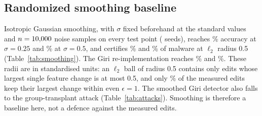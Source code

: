 \subsection{Randomized smoothing baseline}\label{sec:smooth}
Isotropic Gaussian smoothing, with $\sigma$ fixed beforehand at the standard values and $n=10{,}000$ noise samples on every test point (\ResNSeedsSmooth{} seeds), reaches \ResRsQuarterAcc\% accuracy at $\sigma=0.25$ and \ResRsHalfAcc\% at $\sigma=0.5$, and certifies \ResRsQuarterCertHalf\% and \ResRsHalfCertHalf\% of malware at $\ell_2$ radius 0.5 (Table~\ref{tab:smoothing}). The Giri re-implementation reaches \ResRsGiriAcc\% and \ResRsGiriCertHalf\%. These radii are in standardised units: an $\ell_2$ ball of radius 0.5 contains only edits whose largest single feature change is at most 0.5, and only \PsEpsLeOnePct\% of the measured edits keep their largest change within even $\epsilon=1$. The smoothed Giri detector also falls to the group-transplant attack (Table~\ref{tab:attacks}). Smoothing is therefore a baseline here, not a defence against the measured edits. %

\begin{table}[!htbp]
\centering\small
\caption{Randomized smoothing on every test point: clean accuracy, abstention rate and certified detection (\%) at several $\ell_2$ radii (standardised units).}\label{tab:smoothing}

\end{table}
\FloatBarrier
